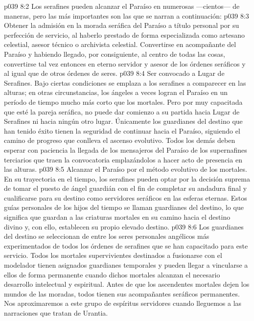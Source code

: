 \vs p039 8:2 \pc Los serafines pueden alcanzar el Paraíso en numerosas ---cientos--- de maneras, pero las más importantes son las que se narran a continuación:
\vs p039 8:3 Obtener la admisión en la morada seráfica del Paraíso a título personal por su perfección de servicio, al haberlo prestado de forma especializada como artesano celestial, asesor técnico o archivista celestial. Convertirse en acompañante del Paraíso y habiendo llegado, por consiguiente, al centro de todas las cosas, convertirse tal vez entonces en eterno servidor y asesor de los órdenes seráficos y al igual que de otros órdenes de seres.
\vs p039 8:4 Ser convocado a Lugar de Serafines. Bajo ciertas condiciones se emplaza a los serafines a comparecer en las alturas; en otras circunstancias, los ángeles a veces logran el Paraíso en un período de tiempo mucho más corto que los mortales. Pero por muy capacitada que esté la pareja seráfica, no puede dar comienzo a su partida hacia Lugar de Serafines ni hacia ningún otro lugar. Únicamente los guardianes del destino que han tenido éxito tienen la seguridad de continuar hacia el Paraíso, siguiendo el camino de progreso que conlleva el ascenso evolutivo. Todos los demás deben esperar con paciencia la llegada de los mensajeros del Paraíso de los supernafines terciarios que traen la convocatoria emplazándolos a hacer acto de presencia en las alturas.
\vs p039 8:5 Alcanzar el Paraíso por el método evolutivo de los mortales. En su trayectoria en el tiempo, los serafines pueden optar por la decisión suprema de tomar el puesto de ángel guardián con el fin de completar su andadura final y cualificarse para su destino como servidores seráficos en las esferas eternas. Estos guías personales de los hijos del tiempo se llaman guardianes del destino, lo que significa que guardan a las criaturas mortales en su camino hacia el destino divino y, con ello, establecen su propio elevado destino.
\vs p039 8:6 Los guardianes del destino se seleccionan de entre los seres personales angélicos más experimentados de todos los órdenes de serafines que se han capacitado para este servicio. Todos los mortales supervivientes destinados a fusionarse con el modelador tienen asignados guardianes temporales y pueden llegar a vincularse a ellos de forma permanente cuando dichos mortales alcanzan el necesario desarrollo intelectual y espiritual. Antes de que los ascendentes mortales dejen los mundos de las moradas, todos tienen sus acompañantes seráficos permanentes. Nos aproximaremos a este grupo de espíritus servidores cuando lleguemos a las narraciones que tratan de Urantia.
